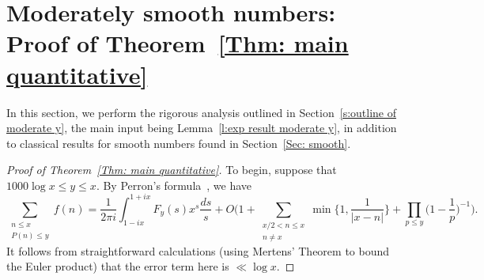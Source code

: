 \documentclass[12pt,a4paper,reqno]{amsart}
\numberwithin{equation}{section}
\def\leq {\leqslant}
\theoremstyle{remark}
\theoremstyle{definition}
\numberwithin{equation}{section}
\theoremstyle{remark}
\begin{document}
\section{Moderately smooth numbers: Proof of Theorem~\ref{Thm: main quantitative}}\label{sec: moderate}

In this section, we perform the rigorous analysis outlined in Section~\ref{s:outline of moderate y}, the main input being Lemma~\ref{l:exp result moderate y}, in addition to classical results for smooth numbers found in Section~\ref{Sec: smooth}.

\begin{proof}[Proof of Theorem~\ref{Thm: main quantitative}]

To begin, suppose that $1000 \log x \leq y \leq x$. By Perron's formula~\cite[Corollary~5.3]{MV2007}, we have
\[
\sum_{\substack{n \leq x \\ P(n) \leq y}} f(n) = \frac{1}{2 \pi i} \int_{1 - i x}^{1 + ix} F_y (s) x^s \frac{ds}{s} + O \Biggl( 1 + \sum_{\substack{x/2 < n \leq x \\ n \neq x}} \min \biggl\{ 1, \frac{1}{|x-n|} \biggr\} + \prod_{p \leq y} \biggl( 1 - \frac{1}{p} \biggr)^{-1} \Biggr).
\]
It follows from straightforward calculations (using Mertens' Theorem to bound the Euler product) that the error term here is $\ll \log x$. 


\end{proof}
\end{document}
